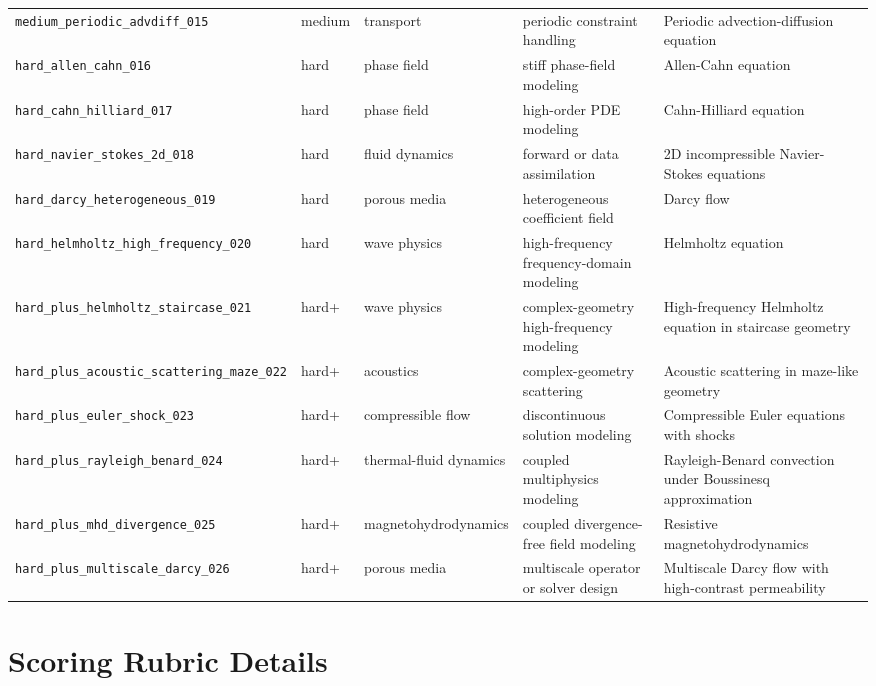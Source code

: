 \documentclass[11pt]{article}
\begin{document}
\begin{table}[t]
\begin{tabularx}{\textwidth}{@{}p{}p{}p{}p{}X@{}}
\texttt{medium\_periodic\_advdiff\_015} & medium & transport & periodic constraint handling & Periodic advection-diffusion equation \\
\texttt{hard\_allen\_cahn\_016} & hard & phase field & stiff phase-field modeling & Allen-Cahn equation \\
\texttt{hard\_cahn\_hilliard\_017} & hard & phase field & high-order PDE modeling & Cahn-Hilliard equation \\
\texttt{hard\_navier\_stokes\_2d\_018} & hard & fluid dynamics & forward or data assimilation & 2D incompressible Navier-Stokes equations \\
\texttt{hard\_darcy\_heterogeneous\_019} & hard & porous media & heterogeneous coefficient field & Darcy flow \\
\texttt{hard\_helmholtz\_high\_frequency\_020} & hard & wave physics & high-frequency frequency-domain modeling & Helmholtz equation \\
\texttt{hard\_plus\_helmholtz\_staircase\_021} & hard+ & wave physics & complex-geometry high-frequency modeling & High-frequency Helmholtz equation in staircase geometry \\
\texttt{hard\_plus\_acoustic\_scattering\_maze\_022} & hard+ & acoustics & complex-geometry scattering & Acoustic scattering in maze-like geometry \\
\texttt{hard\_plus\_euler\_shock\_023} & hard+ & compressible flow & discontinuous solution modeling & Compressible Euler equations with shocks \\
\texttt{hard\_plus\_rayleigh\_benard\_024} & hard+ & thermal-fluid dynamics & coupled multiphysics modeling & Rayleigh-Benard convection under Boussinesq approximation \\
\texttt{hard\_plus\_mhd\_divergence\_025} & hard+ & magnetohydrodynamics & coupled divergence-free field modeling & Resistive magnetohydrodynamics \\
\texttt{hard\_plus\_multiscale\_darcy\_026} & hard+ & porous media & multiscale operator or solver design & Multiscale Darcy flow with high-contrast permeability \\
\bottomrule
\end{tabularx}
\end{table}

\section{Scoring Rubric Details}
\label{app:rubric-details}
\end{document}
